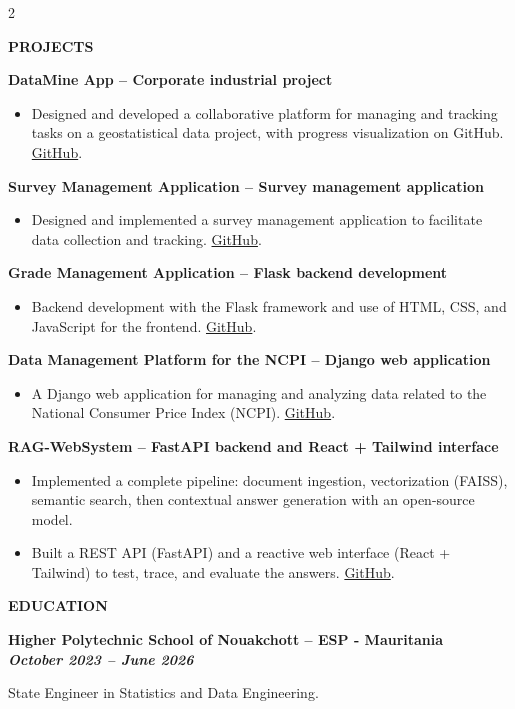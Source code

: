\documentclass[10pt,a4paper,ragged2e,withhyper]{style} \geometry{left=1cm,right=1cm,top=0.4cm,bottom=0.4cm,columnsep=1.2cm} \usepackage{paracol} \usepackage{xcolor} \definecolor{MainGreen}{HTML}{1f2c67} \definecolor{SlateGrey}{HTML}{2E2E2E} \definecolor{LightGrey}{HTML}{666666}  \colorlet{heading}{MainGreen} \colorlet{headingrule}{MainGreen} \colorlet{accent}{MainGreen} \colorlet{emphasis}{SlateGrey} \colorlet{body}{LightGrey} \renewcommand{\cvItemMarker}{{\small\textbullet}} \renewcommand{\cvRatingMarker}{\faCircle} \renewcommand{\cvsectionfont}{\large\bfseries} \renewcommand{\cvsubsectionfont}{\normalsize\bfseries}  \renewcommand{\namefont}{\Huge\rmfamily\bfseries}
\renewcommand{\cvsection}[2][]{%
  \par\vspace{6pt}%
  \ifstrequal{#1}{}{}{\marginpar{\vspace*{\dimexpr1pt-\baselineskip}\raggedright}}%
  {\color{heading}\cvsectionfont \MakeUppercase{#2}}\par%
  \vspace{2pt}
  {\color{headingrule}\hdashrule{\linewidth}{0.5pt}{2pt}\par}\vspace{2pt}
}
\renewcommand{\cvevent}[4]{%
  \normalsize\par\noindent
  {\bfseries\color{emphasis}#1\ifstrequal{#2}{}{}{ -- #2}}%
  \ifstrequal{#3}{}{}{%
    \hfill{\color{accent}\bfseries\itshape\cvDateMarker~%
      \BeginAccSupp{method=pdfstringdef,ActualText={\datename: }}#3\EndAccSupp{}}%
  }\par
  \ifstrequal{#4}{}{}{%
    {\small\itshape\color{body}\cvLocationMarker~%
      \BeginAccSupp{method=pdfstringdef,ActualText={\locationname: }}#4\EndAccSupp{}\par}}%
  \vspace{2pt}%
  \footnotesize
}
\renewcommand{\divider}{\par\noindent\textcolor{body!30}{\hdashrule{\linewidth}{0.5pt}{0.4ex}}\vspace{2pt}}
\begin{document}
\begin{paracol}{2}
\cvsection{Projects}
\cvevent{DataMine App}{Corporate industrial project}{}{}
\begin{itemize}
  \item Designed and developed a collaborative platform for managing and tracking tasks on a geostatistical data project, with progress visualization on GitHub. \href{https://github.com/MoustaphaCheikhJidou/DataMineSynergy-App.git}{GitHub}.
\end{itemize}
\divider
\cvevent{Survey Management Application}{Survey management application}{}{}
\begin{itemize}
  \item Designed and implemented a survey management application to facilitate data collection and tracking. \href{https://github.com/MoustaphaCheikhJidou/survey-data-collection.git}{GitHub}.
\end{itemize}
\divider
\cvevent{Grade Management Application}{Flask backend development}{}{}
\begin{itemize}
  \item Backend development with the Flask framework and use of HTML, CSS, and JavaScript for the frontend. \href{https://github.com/MoustaphaCheikhJidou/ISMSNotesApp.git}{GitHub}.
\end{itemize}
\divider
\cvevent{Data Management Platform for the NCPI}{Django web application}{}{}
\begin{itemize}
  \item A Django web application for managing and analyzing data related to the National Consumer Price Index (NCPI). \href{https://github.com/MoustaphaCheikhJidou/INPC-Data-Management-and-Analysis-Platform}{GitHub}.
\end{itemize}
\divider
\cvevent{RAG-WebSystem}{FastAPI backend and React + Tailwind interface}{}{}
\begin{itemize}
  \item Implemented a complete pipeline: document ingestion, vectorization (FAISS), semantic search, then contextual answer generation with an open-source model.
  \item Built a REST API (FastAPI) and a reactive web interface (React + Tailwind) to test, trace, and evaluate the answers. \href{https://github.com/MoustaphaCheikhJidou/RAG-WebSystem}{GitHub}.
\end{itemize}

\switchcolumn \cvsection{Education}
\cvevent{Higher Polytechnic School of Nouakchott}{ESP - Mauritania}{October 2023 -- June 2026}{} State Engineer in Statistics and Data Engineering.


\end{paracol}
\end{document}
